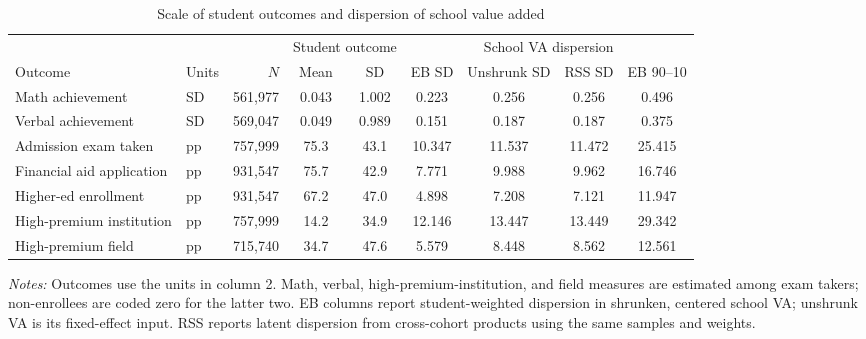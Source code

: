 \begin{table}[!htbp]
\centering
\begin{threeparttable}
\caption{Scale of student outcomes and dispersion of school value added}
\label{tab:school-va-distribution}
\scriptsize
\setlength{\tabcolsep}{2pt}
\begin{tabular}{llrcc cccc}
\toprule
 & & & \multicolumn{2}{c}{Student outcome} & \multicolumn{4}{c}{School VA dispersion} \\
\cmidrule(lr){4-5} \cmidrule(lr){6-9}
Outcome & Units & $N$ & Mean & SD & EB SD & Unshrunk SD & RSS SD & EB 90--10 \\
\midrule
Math achievement & SD & 561,977 & 0.043 & 1.002 & 0.223 & 0.256 & 0.256 & 0.496 \\
Verbal achievement & SD & 569,047 & 0.049 & 0.989 & 0.151 & 0.187 & 0.187 & 0.375 \\
\addlinespace[2pt]
Admission exam taken & pp & 757,999 & 75.3 & 43.1 & 10.347 & 11.537 & 11.472 & 25.415 \\
Financial aid application & pp & 931,547 & 75.7 & 42.9 & 7.771 & 9.988 & 9.962 & 16.746 \\
Higher-ed enrollment & pp & 931,547 & 67.2 & 47.0 & 4.898 & 7.208 & 7.121 & 11.947 \\
\addlinespace[2pt]
High-premium institution & pp & 757,999 & 14.2 & 34.9 & 12.146 & 13.447 & 13.449 & 29.342 \\
High-premium field & pp & 715,740 & 34.7 & 47.6 & 5.579 & 8.448 & 8.562 & 12.561 \\
\bottomrule
\end{tabular}
\begin{tablenotes}[flushleft]
\footnotesize
\item \textit{Notes:} Outcomes use the units in column 2. Math, verbal, high-premium-institution, and field measures are estimated among exam takers; non-enrollees are coded zero for the latter two. EB columns report student-weighted dispersion in shrunken, centered school VA; unshrunk VA is its fixed-effect input. RSS reports latent dispersion from cross-cohort products using the same samples and weights.
\end{tablenotes}
\end{threeparttable}
\end{table}
